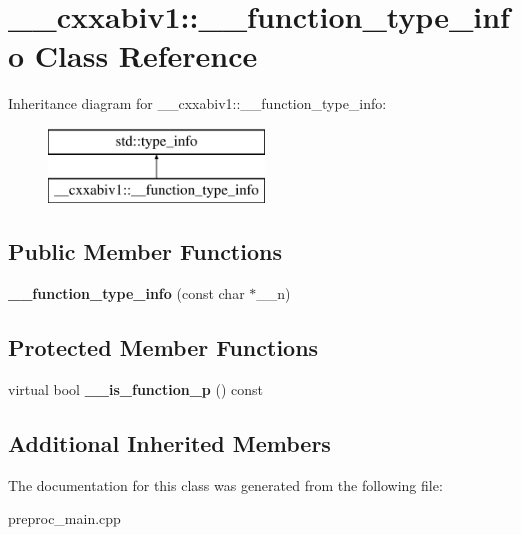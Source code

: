 \hypertarget{class____cxxabiv1_1_1____function__type__info}{\section{\+\_\+\+\_\+cxxabiv1\+:\+:\+\_\+\+\_\+function\+\_\+type\+\_\+info Class Reference}
\label{class____cxxabiv1_1_1____function__type__info}
}
Inheritance diagram for \+\_\+\+\_\+cxxabiv1\+:\+:\+\_\+\+\_\+function\+\_\+type\+\_\+info\+:\begin{figure}[H]
\begin{center}
\leavevmode
\includegraphics[height=2.000000cm]{class____cxxabiv1_1_1____function__type__info}
\end{center}
\end{figure}
\subsection*{Public Member Functions}
\begin{DoxyCompactItemize}
\item 
\hypertarget{class____cxxabiv1_1_1____function__type__info_a0531260de2cde918c9e018db8360da56}{{\bfseries \+\_\+\+\_\+function\+\_\+type\+\_\+info} (const char $\ast$\+\_\+\+\_\+n)}\label{class____cxxabiv1_1_1____function__type__info_a0531260de2cde918c9e018db8360da56}

\end{DoxyCompactItemize}
\subsection*{Protected Member Functions}
\begin{DoxyCompactItemize}
\item 
\hypertarget{class____cxxabiv1_1_1____function__type__info_ac978b671739bfef2f9b1bf6b075db6ba}{virtual bool {\bfseries \+\_\+\+\_\+is\+\_\+function\+\_\+p} () const }\label{class____cxxabiv1_1_1____function__type__info_ac978b671739bfef2f9b1bf6b075db6ba}

\end{DoxyCompactItemize}
\subsection*{Additional Inherited Members}


The documentation for this class was generated from the following file\+:\begin{DoxyCompactItemize}
\item 
preproc\+\_\+main.\+cpp\end{DoxyCompactItemize}
